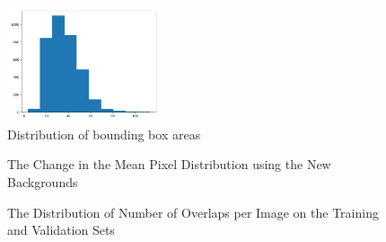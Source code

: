 \documentclass{article}
\begin{document}
\begin{figure}
\centering
\includegraphics[width=0.4\textwidth]{figures/bbox_area_dist_train.png}
\caption{Distribution of bounding box areas}
\label{fig:areas}
\end{figure}

\begin{figure}
\centering
{}
\qquad
{}
\caption{The Change in the Mean Pixel Distribution using the New Backgrounds}
\label{fig:backgrounds}
\end{figure}

\begin{figure}
\centering
{}
\qquad
{}
\caption{The Distribution of Number of Overlaps per Image on the Training and Validation Sets}
\label{fig:overlapdist}
\end{figure}
\end{document}
